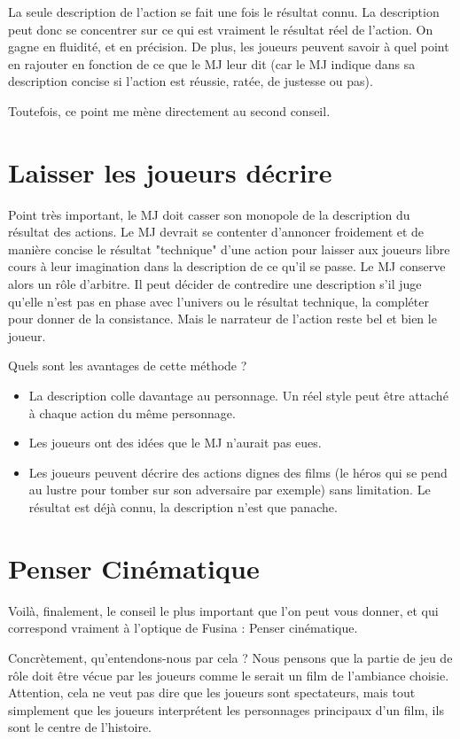 \documentclass{conf/FusinaClass}
\begin{document}
La seule description de l'action se fait une fois le résultat connu. La description peut donc se concentrer sur ce qui est vraiment le résultat réel de l'action. On gagne en fluidité, et en précision. De plus, les joueurs peuvent savoir à quel point en rajouter en fonction de ce que le MJ leur dit (car le MJ indique dans sa description concise si l'action est réussie, ratée, de justesse ou pas).

Toutefois, ce point me mène directement au second conseil.

\section{Laisser les joueurs décrire}
Point très important, le MJ doit casser son monopole de la description du résultat des actions. Le MJ devrait se contenter d'annoncer froidement et de manière concise le résultat "technique" d'une action pour laisser aux joueurs libre cours à leur imagination dans la description de ce qu'il se passe. Le MJ conserve alors un rôle d'arbitre. Il peut décider de contredire une description s'il juge qu'elle n'est pas en phase avec l'univers ou le résultat technique, la compléter pour donner de la consistance. Mais le narrateur de l'action reste bel et bien le joueur.

Quels sont les avantages de cette méthode ?

\begin{itemize}
\item La description colle davantage au personnage. Un réel style peut être attaché à chaque action du même personnage.
\item Les joueurs ont des idées que le MJ n'aurait pas eues.
\item Les joueurs peuvent décrire des actions dignes des films (le héros qui se pend au lustre pour tomber sur son adversaire par exemple) sans limitation. Le résultat est déjà connu, la description n'est que panache.
\end{itemize}

\section{Penser Cinématique}
Voilà, finalement, le conseil le plus important que l'on peut vous donner, et qui correspond vraiment à l'optique de Fusina : Penser cinématique.

Concrètement, qu'entendons-nous par cela ? Nous pensons que la partie de jeu de rôle doit être vécue par les joueurs comme le serait un film de l'ambiance choisie. Attention, cela ne veut pas dire que les joueurs sont spectateurs, mais tout simplement que les joueurs interprétent les personnages principaux d'un film, ils sont le centre de l'histoire. 
\end{document}

